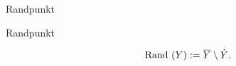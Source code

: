 \documentclass[class=article, crop=false]{standalone}
\begin{document}
\begin{zettel}{Randpunkt}
\begin{flashcard}{Randpunkt}
	\begin{definition}[Rand]
		\[
			\tx{ Rand}(Y) := \bar{Y}  \setminus \dot{Y}
		.\]

	\end{definition}
\end{flashcard}
\end{zettel}
\end{document}
